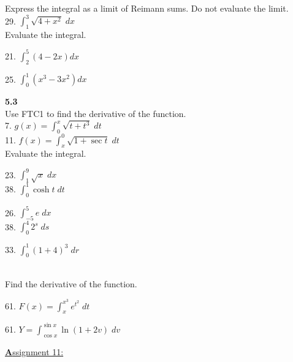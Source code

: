 \documentclass{letter}
\begin{document}
\begin{itemize}
		Express the integral as a limit of Reimann sums. Do not evaluate the limit.\\
		29. $\int_1^3 \sqrt{4 + x^2} \; dx$\\
		
		Evaluate the integral.\\
		\begin{minipage}[t]{0.5\textwidth}
			21. $\int_2^5 (4-2x) dx$
		\end{minipage}
		\begin{minipage}[t]{0.5\textwidth}
			25. $\int_0^1 (x^3 - 3x^2) dx$\\
		\end{minipage}
		
		\textbf{5.3}\\
		
		Use FTC1 to find the derivative of the function.\\
		7. $g(x) = \int_0^x \sqrt{t + t^3} \; dt$\\
		11. $f(x) = \int_x^0 \sqrt{1 + \sec t} \; dt$\\
		
		Evaluate the integral.\\
		\begin{minipage}[t]{0.3\textwidth}
			23. $\int_1^9 \sqrt x \; dx$\\
			38. $\int_0^1 \cosh t \; dt$\\
		\end{minipage}
		\begin{minipage}[t]{0.3\textwidth}
			26. $\int_{-5}^5 e\; dx$\\
			38. $\int_0^4 2^s \; ds$
		\end{minipage}
		\begin{minipage}[t]{0.3\textwidth}
			33. $\int_0^1 (1+4)^3 \; dr$
		\end{minipage}\\
		
		Find the derivative of the function.\\
		\begin{minipage}[t]{0.5\textwidth}
			61. $F(x) = \int_x^{x^3} e^{t^2}\; dt$
		\end{minipage}
		\begin{minipage}[t]{0.5\textwidth}
			61. $Y = \int_{\cos x}^{\sin x} \ln(1+2v) \; dv$
		\end{minipage}
	\end{itemize}
	\clearpage
	\large\underline{\textbf Assignment 11:}
\end{document}
